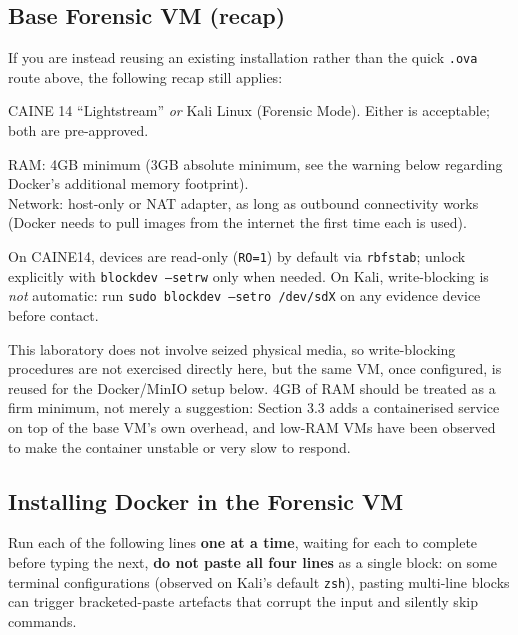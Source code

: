 \subsection{Base Forensic VM (recap)}

If you are instead reusing an existing installation rather than the quick \texttt{.ova} route above, the following recap still applies:

\begin{description}[leftmargin=1.5cm, style=nextline]
	\item[Choice of distribution] CAINE 14 ``Lightstream'' \emph{or} Kali Linux (Forensic
	      Mode). Either is acceptable; both are pre-approved.
	\item[VM configuration] RAM: 4GB minimum (3GB absolute minimum, see the warning below
	      regarding Docker's additional memory footprint).\\
		  Network: host-only or NAT adapter,
	      as long as outbound connectivity works (Docker needs to pull images from the internet
	      the first time each is used).
	\item[Write-blocking] On CAINE14, devices are read-only (\texttt{RO=1}) by default via
	      \texttt{rbfstab}; unlock explicitly with \texttt{blockdev --setrw} only when needed.
	      On Kali, write-blocking is \emph{not} automatic: run
	      \texttt{sudo blockdev --setro /dev/sdX} on any evidence device before contact.
\end{description}

\begin{warningbox}
This laboratory does not involve seized physical media, so write-blocking procedures are not
exercised directly here, but the same VM, once configured, is reused for the Docker/MinIO
setup below. 4GB of RAM should be treated as a firm minimum, not merely a suggestion: Section 3.3
adds a containerised service on top of the base VM's own overhead, and low-RAM VMs have been
observed to make the container unstable or very slow to respond.
\end{warningbox}

\subsection{Installing Docker in the Forensic VM}

Run each of the following lines \textbf{one at a time}, waiting for each to complete before
typing the next, \textbf{do not paste all four lines} as a single block: on some terminal configurations (observed on Kali's default \texttt{zsh}), pasting multi-line blocks can trigger bracketed-paste artefacts that corrupt the input and silently skip commands.

